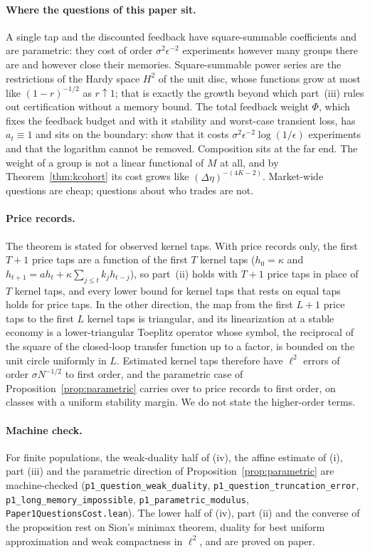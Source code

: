 \paragraph{Where the questions of this paper sit.} A single tap and the discounted feedback have square-summable coefficients and are parametric: they cost of order $\sigma^2\epsilon^{-2}$ experiments however many groups there are and however close their memories. Square-summable power series are the restrictions of the Hardy space $H^2$ of the unit disc, whose functions grow at most like $(1-r)^{-1/2}$ as $r\uparrow1$; that is exactly the growth beyond which part~(iii) rules out certification without a memory bound. The total feedback weight $\Phi$, which fixes the feedback budget and with it stability and worst-case transient loss, has $a_t\equiv1$ and sits on the boundary: \citet{niroula2026b} show that it costs $\sigma^2\epsilon^{-2}\log(1/\epsilon)$ experiments and that the logarithm cannot be removed. Composition sits at the far end. The weight of a group is not a linear functional of $M$ at all, and by Theorem~\ref{thm:kcohort} its cost grows like $(\Delta\eta)^{-(4K-2)}$. Market-wide questions are cheap; questions about who trades are not.

\paragraph{Price records.} The theorem is stated for observed kernel taps. With price records only, the first $T+1$ price taps are a function of the first $T$ kernel taps ($h_0=\kappa$ and $h_{t+1}=ah_t+\kappa\sum_{j\le t}k_jh_{t-j}$), so part~(ii) holds with $T+1$ price taps in place of $T$ kernel taps, and every lower bound for kernel taps that rests on equal taps holds for price taps. In the other direction, the map from the first $L+1$ price taps to the first $L$ kernel taps is triangular, and its linearization at a stable economy is a lower-triangular Toeplitz operator whose symbol, the reciprocal of the square of the closed-loop transfer function up to a factor, is bounded on the unit circle uniformly in $L$. Estimated kernel taps therefore have $\ell^2$ errors of order $\sigma N^{-1/2}$ to first order, and the parametric case of Proposition~\ref{prop:parametric} carries over to price records to first order, on classes with a uniform stability margin. We do not state the higher-order terms.

\paragraph{Machine check.} For finite populations, the weak-duality half of (iv), the affine estimate of (i), part (iii) and the parametric direction of Proposition~\ref{prop:parametric} are machine-checked (\texttt{p1\_question\_weak\_duality}, \texttt{p1\_question\_truncation\_error}, \texttt{p1\_long\_memory\_impossible}, \texttt{p1\_parametric\_modulus}, \nolinkurl{Paper1QuestionsCost.lean}). The lower half of (iv), part (ii) and the converse of the proposition rest on Sion's minimax theorem, duality for best uniform approximation and weak compactness in $\ell^2$, and are proved on paper.

